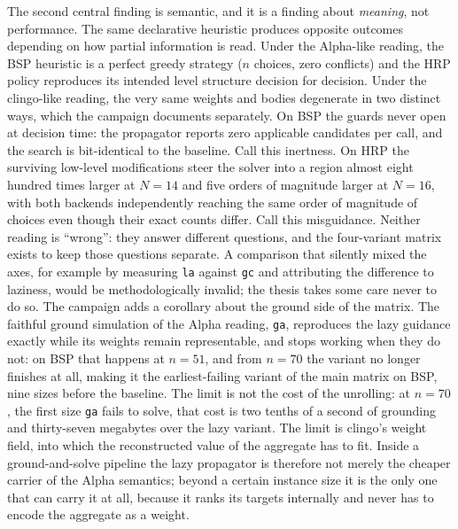 The second central finding is semantic, and it is a finding about \emph{meaning}, not performance. The same declarative heuristic produces opposite outcomes depending on how partial information is read. Under the Alpha-like reading, the BSP heuristic is a perfect greedy strategy ($n$ choices, zero conflicts) and the HRP policy reproduces its intended level structure decision for decision. Under the clingo-like reading, the very same weights and bodies degenerate in two distinct ways, which the campaign documents separately. On BSP the guards never open at decision time: the propagator reports zero applicable candidates per call, and the search is bit-identical to the baseline. Call this inertness. On HRP the surviving low-level modifications steer the solver into a region almost eight hundred times larger at $N=14$ and five orders of magnitude larger at $N=16$, with both backends independently reaching the same order of magnitude of choices even though their exact counts differ. Call this misguidance. Neither reading is \enquote{wrong}: they answer different questions, and the four-variant matrix exists to keep those questions separate. A comparison that silently mixed the axes, for example by measuring \texttt{la} against \texttt{gc} and attributing the difference to laziness, would be methodologically invalid; the thesis takes some care never to do so. The campaign adds a corollary about the ground side of the matrix. The faithful ground simulation of the Alpha reading, \texttt{ga}, reproduces the lazy guidance exactly while its weights remain representable, and stops working when they do not: on BSP that happens at $n=51$, and from $n=70$ the variant no longer finishes at all, making it the earliest-failing variant of the main matrix on BSP, nine sizes before the baseline. The limit is not the cost of the unrolling: at $n=70$, the first size \texttt{ga} fails to solve, that cost is two tenths of a second of grounding and thirty-seven megabytes over the lazy variant. The limit is clingo's weight field, into which the reconstructed value of the aggregate has to fit. Inside a ground-and-solve pipeline the lazy propagator is therefore not merely the cheaper carrier of the Alpha semantics; beyond a certain instance size it is the only one that can carry it at all, because it ranks its targets internally and never has to encode the aggregate as a weight.

